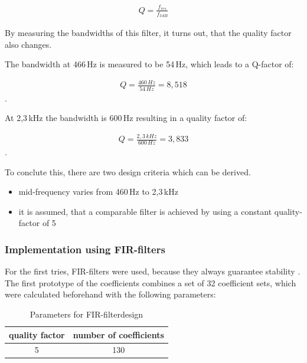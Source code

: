 \begin{align}
    Q = \frac{f_{res}}{f_{3\,dB}}
    \label{eq:q-factor}
\end{align}

By measuring the bandwidths of this filter, it turns out, that the quality factor also changes.

The bandwidth at 466\,Hz is measured to be 54\,Hz, which leads to a Q-factor of:

\begin{align}
    Q = \frac{460\,Hz}{54\,Hz} = 8,518
\end{align}
.

At 2,3\,kHz the bandwidth is 600\,Hz resulting in a quality factor of:

\begin{align}
    Q = \frac{2,3\,kHz}{600\,Hz} = 3,833
\end{align}
.


To conclute this, there are two design criteria which can be derived.

\begin{itemize}
    \item mid-frequency varies from 460\,Hz to 2,3\,kHz
    \item it is assumed, that a comparable filter is achieved by using a constant quality-factor of 5
\end{itemize}

\subsubsection{Implementation using \ac{FIR}-filters}

For the first tries, \ac{FIR}-filters were used, because they always guarantee stability \cite{meyer_signalverarbeitung}.
The first prototype of the coefficients combines a set of 32 coefficient sets, which were calculated beforehand
with the following parameters:

\begin{table}[!h]
    \centering
    \caption{Parameters for \ac{FIR}-filterdesign}
    \label{table:fir-filterdesign}
    \begin{tabular}{c | c }
        quality factor & number of coefficients\\
        \hline
        5 & 130
    \end{tabular}
\end{table}

